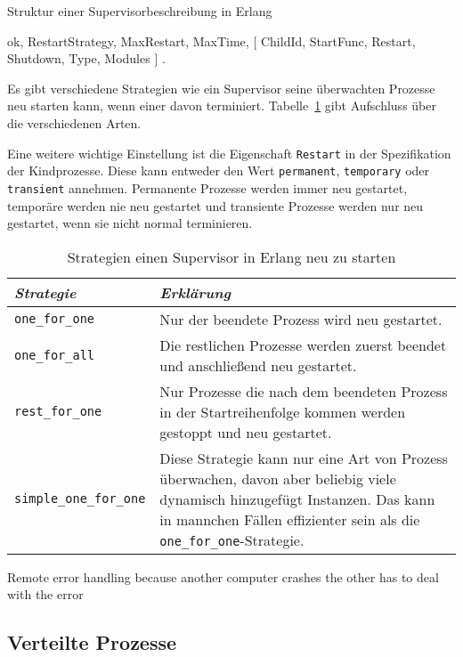 \begin{program}[!hbt]
\caption{Struktur einer Supervisorbeschreibung in Erlang}
\label{prog:erlang-supervision-behavior}
\begin{ErlangCode}
{ ok, 
  { {RestartStrategy, MaxRestart, MaxTime},
	  [ {ChildId, StartFunc, Restart, Shutdown, Type, Modules} ]
	}
}.
\end{ErlangCode}
\end{program}

Es gibt verschiedene Strategien wie ein Supervisor seine überwachten Prozesse neu starten kann, wenn einer davon terminiert. Tabelle~\ref{tab:erlang-restart-strategy} gibt Aufschluss über die verschiedenen Arten.

Eine weitere wichtige Einstellung ist die Eigenschaft \lstinline{Restart} in der Spezifikation der Kindprozesse. Diese kann entweder den Wert \lstinline{permanent}, \lstinline{temporary} oder \lstinline{transient} annehmen. Permanente Prozesse werden immer neu gestartet, temporäre werden nie neu gestartet und transiente Prozesse werden nur neu gestartet, wenn sie nicht normal terminieren.

\begin{table}[!hbt]
\caption{Strategien einen Supervisor in Erlang neu zu starten}
\label{tab:erlang-restart-strategy}
\centering
\begin{tabular}{|l|p{8cm}|}
\hline
\emph{Strategie} & \emph{Erklärung} \\
\hline
\lstinline$one_for_one$ & Nur der beendete Prozess wird neu gestartet. \\
\hline
\lstinline$one_for_all$ & Die restlichen Prozesse werden zuerst beendet und anschließend neu gestartet. \\
\hline
\lstinline$rest_for_one$ & Nur Prozesse die nach dem beendeten Prozess in der Startreihenfolge kommen werden gestoppt und neu gestartet. \\
\hline
\lstinline$simple_one_for_one$ & Diese Strategie kann nur eine Art von Prozess überwachen, davon aber beliebig viele dynamisch hinzugefügt Instanzen. Das kann in mannchen Fällen effizienter sein als die \lstinline$one_for_one$-Strategie. \\
\hline
\end{tabular}
\end{table}


Remote error handling because another computer crashes the other has to deal with the error

\subsection{Verteilte Prozesse}

